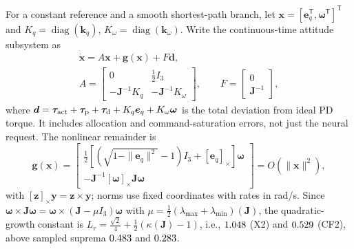 \documentclass[letterpaper, 10 pt, conference]{ieeeconf}
\newcommand{\T}{^{\mathsf T}}
\begin{document}
For a constant reference and a smooth shortest-path branch, let
$\bm x=[\bm e_q\T,\bm\omega\T]\T$ and
$K_q=\operatorname{diag}(\bm k_q)$, $K_\omega=\operatorname{diag}(\bm k_\omega)$.
Write the continuous-time attitude subsystem as
\begin{equation}
 \begin{gathered}
 \dot{\bm x}=A\bm x+\bm g(\bm x)+F\bm d,\\
 A=\begin{bmatrix}0&\frac12I_3\\-\bm J^{-1}K_q&-\bm J^{-1}K_\omega\end{bmatrix},
 \qquad F=\begin{bmatrix}0\\\bm J^{-1}\end{bmatrix},
 \end{gathered}
 \label{eq:localmodel}
\end{equation}
where $\bm d=\bm\tau_{\rm act}+\bm\tau_{\rm p}+\bm\tau_{\rm d}
 +K_q\bm e_q+K_\omega\bm\omega$ is the total deviation from ideal PD torque.
It includes allocation and command-saturation errors, not just the neural
request. The nonlinear remainder is
\begin{equation}
 \bm g(\bm x)=\begin{bmatrix}
 \tfrac12[(\sqrt{1-\|\bm e_q\|^2}-1)I_3+[\bm e_q]_\times]\bm\omega\\
 -\bm J^{-1}[\bm\omega]_\times\bm J\bm\omega
 \end{bmatrix}=O(\|\bm x\|^2),
 \label{eq:localremainder}
\end{equation}
with $[\bm z]_\times\bm y=\bm z\times\bm y$; norms use fixed coordinates with rates in rad/s.
Since $\bm\omega\times\bm J\bm\omega=\bm\omega\times(\bm J-\mu I_3)\bm\omega$ with
$\mu=\frac12(\lambda_{\max}+\lambda_{\min})(\bm J)$, the quadratic-growth constant is
$L_r=\tfrac{\sqrt2}{4}+\tfrac12(\kappa(\bm J)-1)$, i.e., $1.048$ (X2) and $0.529$ (CF2),
above sampled suprema $0.483$ and $0.283$.
\end{document}
